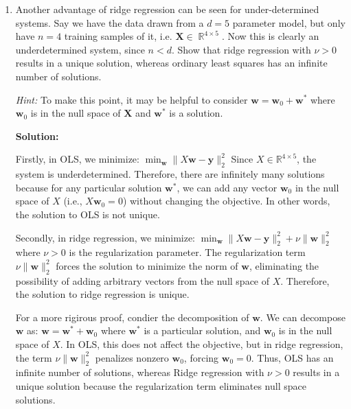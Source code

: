 \documentclass{article}
\newcommand{\mat}[1]{\mathbf{#1}}
\renewcommand{\vec}[1]{\boldsymbol{\mathbf{#1}}}
\DeclareMathOperator{\R}{\mathbb{R}}
\newenvironment{solution}{\color{blue} \smallskip \textbf{Solution:}}{}
\begin{document}
\begin{enumerate}
\begin{solution}
    \end{solution}

    \newpage
    \item Another advantage of ridge regression can be seen for under-determined systems. Say we have the data drawn from a $d = 5$ parameter model, but only have $n = 4$ training samples of it, i.e. $\mat{X} \in \R^{4 \times 5}$. Now this is clearly an underdetermined system, since $n < d$. Show that ridge regression with $\nu > 0$ results in a unique solution, whereas ordinary least squares has an infinite number of solutions.
    
    \emph{Hint:} To make this point, it may be helpful to consider $\vec{w} = \vec{w}_0 + \vec{w}^*$ where $\vec{w}_0$ is in the null space of $\mat X$ and $\vec{w}^*$ is a solution.
    
    \begin{solution}
    
Firstly, in OLS, we minimize:
\(
\min_{\mathbf{w}} \| X \mathbf{w} - \mathbf{y} \|_2^2
\)
Since \( X \in \mathbb{R}^{4 \times 5} \), the system is underdetermined. Therefore, there are infinitely many solutions because for any particular solution \( \mathbf{w}^* \), we can add any vector \( \mathbf{w}_0 \) in the null space of \( X \) (i.e., \( X \mathbf{w}_0 = 0 \)) without changing the objective. In other words, the solution to OLS is not unique.

Secondly, in ridge regression, we minimize:
\(
\min_{\mathbf{w}} \| X \mathbf{w} - \mathbf{y} \|_2^2 + \nu \| \mathbf{w} \|_2^2
\)
where \( \nu > 0 \) is the regularization parameter. The regularization term \( \nu \| \mathbf{w} \|_2^2 \) forces the solution to minimize the norm of \( \mathbf{w} \), eliminating the possibility of adding arbitrary vectors from the null space of \( X \). Therefore, the solution to ridge regression is unique.

For a more rigirous proof, condier the decomposition of \( \mathbf{w} \). We can decompose \( \mathbf{w} \) as:
\(
\mathbf{w} = \mathbf{w}^* + \mathbf{w}_0
\)
where \( \mathbf{w}^* \) is a particular solution, and \( \mathbf{w}_0 \) is in the null space of \( X \). In OLS, this does not affect the objective, but in ridge regression, the term \( \nu \| \mathbf{w} \|_2^2 \) penalizes nonzero \( \mathbf{w}_0 \), forcing \( \mathbf{w}_0 = 0 \). Thus, OLS has an infinite number of solutions, whereas Ridge regression with \( \nu > 0 \) results in a unique solution because the regularization term eliminates null space solutions.


\end{solution}
\end{enumerate}
\end{document}
